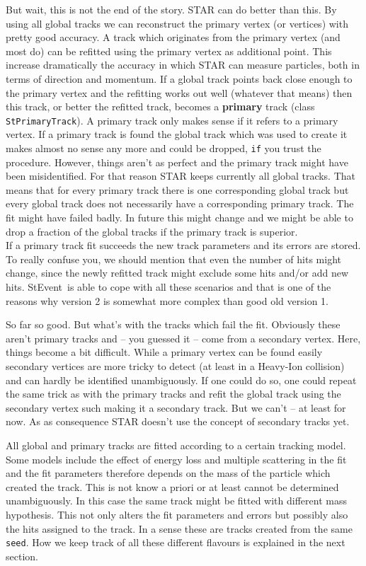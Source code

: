\documentclass[twoside]{article}
\newcommand{\StEvent}{\textsf{StEvent}}
\begin{document}
But wait, this is not the end of the story. STAR can do better than
this. By using all global tracks we can reconstruct the primary vertex
(or vertices) with pretty good accuracy. A track which originates from
the primary vertex (and most do) can be refitted using the primary
vertex as additional point.  This increase dramatically the accuracy
in which STAR can measure particles, both in terms of direction and
momentum.  If a global track points back close enough to the primary
vertex and the refitting works out well (whatever that means) then
this track, or better the refitted track, becomes a \textbf{primary}
track (class \texttt{StPrimaryTrack}). A primary track only makes
sense if it refers to a primary vertex.  If a primary track is found
the global track which was used to create it makes almost no sense any
more and could be dropped, \texttt{if} you trust the procedure.
However, things aren't as perfect and the primary track might have
been misidentified.  For that reason STAR keeps currently all global
tracks. That means that for every primary track there is one
corresponding global track but every global track does not necessarily
have a corresponding primary track. The fit might have failed badly.
In future this might change and we might be able to drop
a fraction of the global tracks if the primary track is superior. \\
If a primary track fit succeeds the new track parameters and its
errors are stored.  To really confuse you, we should mention that even
the number of hits might change, since the newly refitted track might
exclude some hits and/or add new hits.  \StEvent\ is able to cope with
all these scenarios and that is one of the reasons why version 2 is
somewhat more complex than good old version 1.

So far so good. But what's with the tracks which fail the fit.
Obviously these aren't primary tracks and -- you guessed it -- come
from a secondary vertex.  Here, things become a bit difficult. While a
primary vertex can be found easily secondary vertices are more tricky
to detect (at least in a Heavy-Ion collision) and can hardly be
identified unambiguously. If one could do so, one could repeat the
same trick as with the primary tracks and refit the global track using
the secondary vertex such making it a secondary track. But we can't --
at least for now. As as consequence STAR doesn't use the concept of
secondary tracks yet.

All global and primary tracks are fitted according to a certain
tracking model. Some models include the effect of energy loss and
multiple scattering in the fit and the fit parameters therefore
depends on the mass of the particle which created the track. This is
not know a priori or at least cannot be determined unambiguously. In
this case the same track might be fitted with different mass
hypothesis.  This not only alters the fit parameters and errors but
possibly also the hits assigned to the track.  In a sense these are
tracks created from the same \texttt{seed}. How we keep track of all
these different flavours is explained in the next section.
\end{document}
